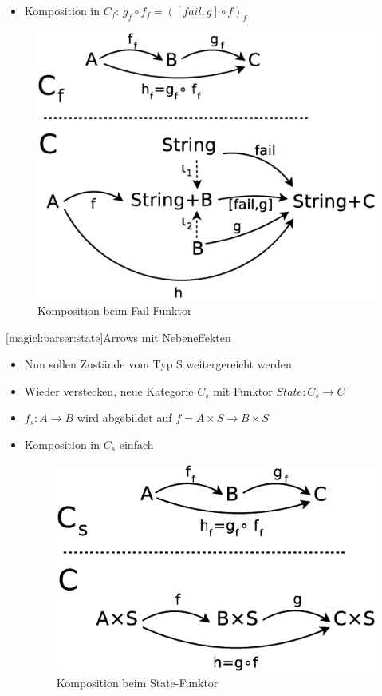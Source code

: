 \documentclass[a4paper, bibgerm]{article}
\newcommand\lsubsubsection{}
\begin{document}
  \begin{itemize}
  \item Komposition in $C_{f}$:  $g_{f} \circ f_{f} = ([fail,g] \circ f)_{f}$ 
  \end{itemize}
  \begin{figure}
    \centering
    \includegraphics[scale=0.3]{images/cat_fail}
    \caption{Komposition beim Fail-Funktor}
  \end{figure}

\lsubsubsection[magicl:parser:state]{Arrows mit Nebeneffekten}

  \begin{itemize}
  \item Nun sollen Zustände vom Typ S weitergereicht werden
  \item Wieder verstecken, neue Kategorie $C_{s}$ mit Funktor
    $State : C_{s} \rightarrow C$
  \item $f_{s} : A \rightarrow B$ wird abgebildet auf
    $f = A \times S \rightarrow B \times S$
  \item Komposition in $C_{s}$ einfach
    \begin{figure}
      \centering
      \includegraphics[scale=0.2]{images/cat_state}
      \caption{Komposition beim State-Funktor}
    \end{figure}
  \end{itemize}
\end{document}
